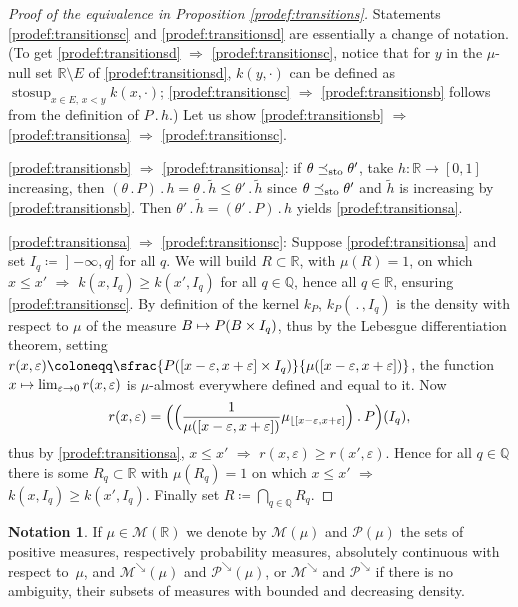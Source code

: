 \documentclass[JEP,XML,SOM,Unicode,NoEqCountersInSection,NoFloatCountersInSection,published]{cedram}
\newcommand{\ldot}{\mathbin{.}}
\newcommand\mto{\mathchoice{\longmapsto}{\mapsto}{\mapsto}{\mapsto}}
\theoremstyle{plain}
\theoremstyle{definition}
\newtheorem{notation}[them]{Notation} %
\newcommand{\eqdef}{\coloneqq}
\let\eps\varepsilon
\newcommand{\p}{\mathcal{P}}
\newcommand{\m}{\mathcal{M}}
\newcommand{\R}{\mathbb{R}}
\newcommand{\Q}{\mathbb{Q}}
\newcommand{\stosup}{\operatorname{stosup}}
\newcommand{\leqs}{\preceq_{\text{\rm sto}}}
\newcommand{\pdec}{\mathcal{P}^{\scriptscriptstyle\searrow}}
\newcommand{\mdec}{\mathcal{M}^{\scriptscriptstyle\searrow}}
\newcommand{\op}{\mathopen}
\begin{document}
\begin{proof}[Proof of the equivalence in Proposition \ref{prodef:transitions}]
Statements \eqref{prodef:transitionsc} and \eqref{prodef:transitionsd} are essentially a change of notation. (To get \eqref{prodef:transitionsd} $\Rightarrow$ \eqref{prodef:transitionsc}, notice that for $y$ in the $\mu$-null set $\R\setminus E$ of \eqref{prodef:transitionsd}, $k(y,\cdot)$ can be defined as $\stosup_{x\in E,\,x<y} k(x,\cdot)$; \eqref{prodef:transitionsc} $\!\Rightarrow\!$ \eqref{prodef:transitionsb} follows from the definition of $P\ldot h$.) Let us show \eqref{prodef:transitionsb} $\Rightarrow$ \eqref{prodef:transitionsa} $\Rightarrow$ \eqref{prodef:transitionsc}.

\eqref{prodef:transitionsb} $\Rightarrow$ \eqref{prodef:transitionsa}: if $\theta\leqs \theta'$, take $h:\R\to[0,1]$ increasing, then $(\theta \ldot P)\ldot h= \theta \ldot\tilde h\leq \theta' \ldot\tilde h$ since $\theta\leqs \theta'$ and $\tilde h$ is increasing by \eqref{prodef:transitionsb}. Then $\theta'\ldot\tilde h=(\theta'\ldot P)\ldot h$ yields \eqref{prodef:transitionsa}.

\eqref{prodef:transitionsa} $\Rightarrow$ \eqref{prodef:transitionsc}: Suppose \eqref{prodef:transitionsa} and set $I_q\eqdef\op]-\infty,q]$ for all $q$. We will build $R\subset\R$, with $\mu(R)=1$, on which $x\leqslant x'$ $\Rightarrow$ $k(x,I_q)\geqslant k(x',I_q)$ for all $q\in\Q$, hence all $q\in\R$, ensuring \eqref{prodef:transitionsc}. By definition of the kernel $k_P$, $k_P(\,.\,,I_q)$ is the density with respect to $\mu$ of the measure $B\mto P(B\times I_q)$, thus by the Lebesgue differentiation theorem, setting $r(x,\eps)\eqdef\sfrac{P([x-\eps,x+\eps]\times I_q)}{\mu([x-\eps,x+\eps])}$, the function $x\mto\lim_{\eps\to0}r(x,\eps)$ is $\mu$-almost everywhere defined and equal to it. Now
\[
r(x,\eps)=\Bigl(\Bigl(\frac1{\mu([x-\eps,x+\eps])}\mu_{\lfloor[x-\eps,x+\eps]}\Bigr)\ldot P\Bigr)(I_q),
\]
thus by \eqref{prodef:transitionsa}, $x\leqslant x'$ $\Rightarrow$ $r(x,\eps)\geqslant r(x',\eps)$. Hence for all $q\in\Q$ there is some $R_q\subset \R$ with $\mu(R_q)=1$ on which $x\leqslant x'$ $\Rightarrow$ $k(x,I_q)\geqslant k(x',I_q)$. Finally set $R\eqdef\bigcap_{q\in\Q} R_q$.
\end{proof}

\begin{notation}\label{notation:mdec}
If $\mu\in\m(\R)$ we denote by $\m(\mu)$ and $\p(\mu)$ the sets of positive measures, respectively probability measures, absolutely continuous with respect to~$\mu$, and $\mdec(\mu)$ and $\pdec(\mu)$, or $\mdec$ and $\pdec$ if there is no ambiguity, their subsets of measures with bounded and decreasing density.
\end{notation}
\end{document}
